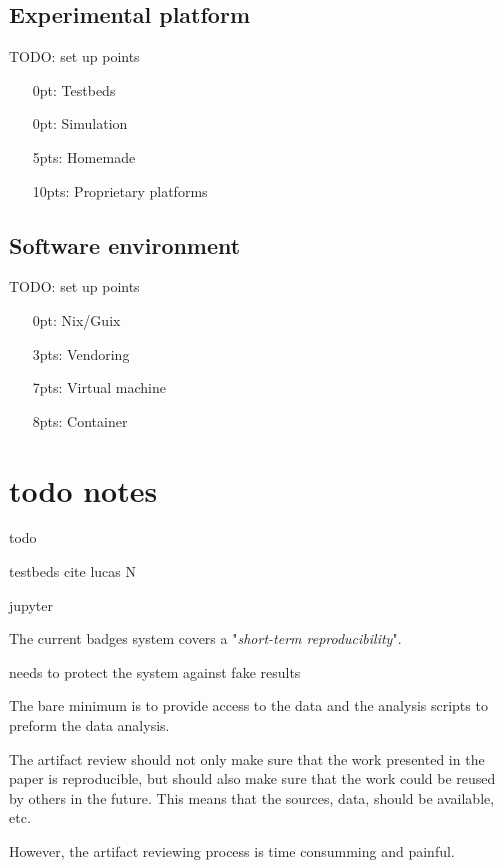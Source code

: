 \documentclass[sigconf]{acmart}
\newcommand{\todo}[1]{{\color{red}TODO: #1}}
\begin{document}
\subsection{Experimental platform}

\todo{set up points}

\begin{itemize}
  \item[0pt:] Testbeds
  \item[0pt:] Simulation
  \item[5pts:] Homemade
  \item[10pts:] Proprietary platforms
\end{itemize}

\subsection{Software environment}

\todo{set up points}

\begin{itemize}
  \item[0pt:] Nix/Guix
  \item[3pts:] Vendoring
  \item[7pts:] Virtual machine
  \item[8pts:] Container
\end{itemize}



\section{todo notes}

todo

testbeds cite lucas N

jupyter 

The current badges system covers a "\emph{short-term reproducibility}".

needs to protect the system against fake results 

The bare minimum is to provide access to the data and the analysis scripts to preform the data analysis.

The artifact review should not only make sure that the work presented in the paper is reproducible, but should also make sure that the work could be reused by others in the future.
This means that the sources, data, should be available, etc.

However, the artifact reviewing process is time consumming and painful.
\end{document}
